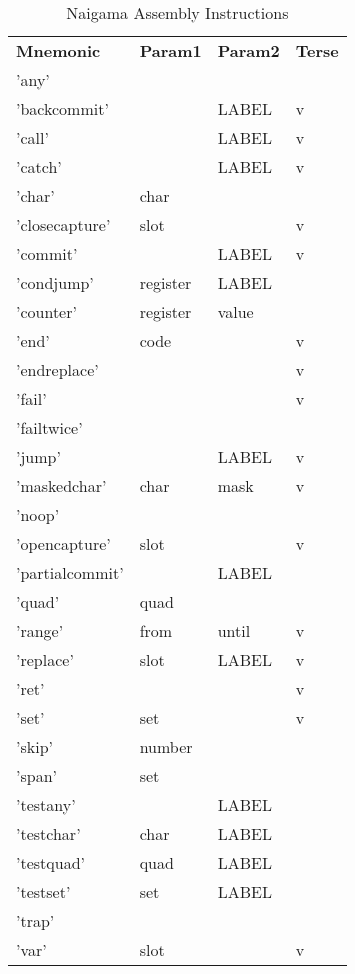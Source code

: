 
\begin{table}[]
\centering
\caption{Naigama Assembly Instructions}
\label{tab:naig_assembly}
\begin{tabular}{llll}
\textbf{Mnemonic} & \textbf{Param1} & \textbf{Param2} & \textbf{Terse} \\
'any' &  &  &  \\
'backcommit' &  & LABEL & v \\
'call' &  & LABEL & v \\
'catch' &  & LABEL & v \\
'char' & char &  &  \\
'closecapture' & slot &  & v \\
'commit' &  & LABEL & v \\
'condjump' & register & LABEL &  \\
'counter' & register & value &  \\
'end' & code &  & v \\
'endreplace' &  &  & v \\
'fail' &  &  & v \\
'failtwice' &  &  &  \\
'jump' &  & LABEL & v \\
'maskedchar' & char & mask & v \\
'noop' &  &  &  \\
'opencapture' & slot &  & v \\
'partialcommit' &  & LABEL &  \\
'quad' & quad &  &  \\
'range' & from & until & v \\
'replace' & slot & LABEL & v \\
'ret' &  &  & v \\
'set' & set &  & v \\
'skip' & number &  &  \\
'span' & set &  &  \\
'testany' &  & LABEL &  \\
'testchar' & char & LABEL &  \\
'testquad' & quad & LABEL &  \\
'testset' & set & LABEL &  \\
'trap' &  &  &  \\
'var' & slot &  & v \\
\end{tabular}
\end{table}
